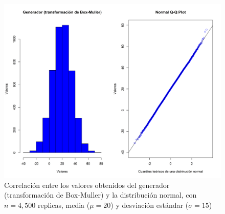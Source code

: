 \documentclass{article}
\begin{document}
\begin{figure}
\centering
\includegraphics[width=\linewidth]{Figures/uniformeNormal1.png}
\caption{Correlación entre los valores obtenidos del generador (transformación de Box-Muller) y la distribución normal, con $n= 4,500$ replicas, media ($\mu = 20$) y desviación estándar ($\sigma = 15$)}
\label{uniformeNormal}
\end{figure}




\end{document}
